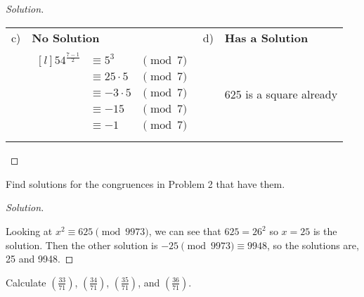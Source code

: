 \documentclass[11pt]{article}
\newcommand\leg[2]{\left(\frac{#1}{#2}\right)}
\newenvironment{problem}[2][Problem]{\begin{trivlist}
\item[\hskip \labelsep {\bfseries #1}\hskip \labelsep {\bfseries #2.}]}{\end{trivlist}}
\newenvironment{solution}
  {\renewcommand\qedsymbol{$~$}\begin{proof}[Solution]$ $\par\nobreak\ignorespaces}
  {\end{proof}}
\begin{document}
\begin{solution}
\begin{tabular}[]{llll}
    c) & \textbf{ No Solution} & \phantom{space} d)                                                      & \textbf{ Has a Solution} \\
       &
    $\begin{matrix*}[l]
         54^{\frac{7-1}{2}} & \equiv 5^{3}      & \pmod{7} \\
         & \equiv 25 \cdot 5 & \pmod{7} \\
         & \equiv -3 \cdot 5 & \pmod{7} \\
         & \equiv -15        & \pmod{7} \\
         & \equiv -1         & \pmod{7} \\
       \end{matrix*}$
       &                       & 625 is a square already
  \end{tabular}

\end{solution}


\begin{problem}{4}
Find solutions for the congruences in Problem 2 that have them.
\end{problem}

\begin{solution}
  Looking at $x^2\equiv 625 \pmod{9973}$,  we can see that $625=26^2$ so $x=25$ is the solution. Then the other solution is $-25\pmod{9973}\equiv 9948$, so the solutions are, 25 and 9948.
\end{solution}


\begin{problem}{5}
Calculate $\leg{33}{71}$, $\leg{34}{71}$, $\leg{35}{71}$, and $\leg{36}{71}.$
\end{problem}
\end{document}
